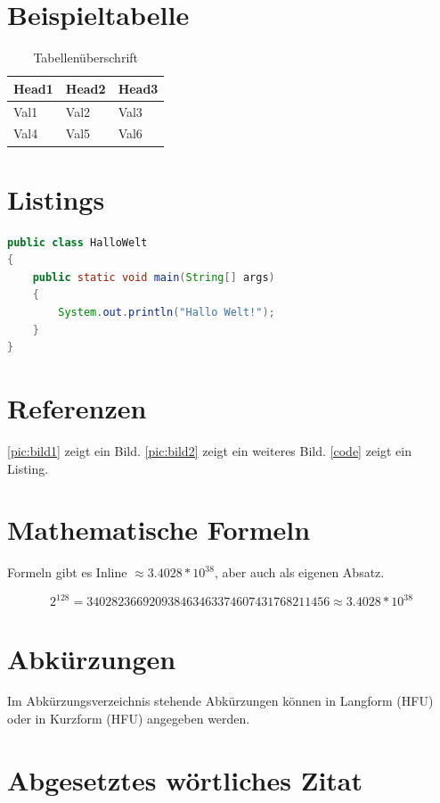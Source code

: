 \section{Beispieltabelle}

\begin{table}
\caption{Tabellenüberschrift}
\center
\footnotesize
\begin{tabular}{lll}
\toprule
Head1 & Head2 & Head3 \\
\midrule
Val1 & Val2 & Val3 \\
Val4 & Val5 & Val6 \\
\bottomrule
\end{tabular}
\end{table}

\section{Listings}

\begin{lstlisting}[language=java, caption=Hallo Welt in Java, label=code]
public class HalloWelt 
{
	public static void main(String[] args) 
	{
		System.out.println("Hallo Welt!");
	}
}
\end{lstlisting}

\section{Referenzen}

\autoref{pic:bild1} zeigt ein Bild. \autoref{pic:bild2} zeigt ein weiteres Bild. \autoref{code} zeigt ein Listing.

\section{Mathematische Formeln}

Formeln gibt es Inline $\approx 3.4028*10^{38}$, aber auch als eigenen Absatz.

\[2^{128} = 340282366920938463463374607431768211456 \approx 3.4028*10^{38}\]

\section{Abkürzungen}

Im Abkürzungsverzeichnis stehende Abkürzungen können in Langform (\ac{HFU}) oder in Kurzform (\acs{HFU}) angegeben werden.

\section{Abgesetztes wörtliches Zitat}

